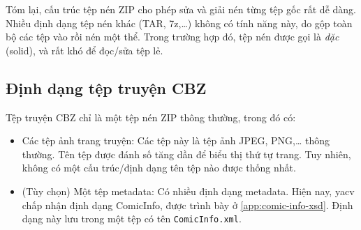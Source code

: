 \documentclass[../../thesis]{subfiles}
\begin{document}
Tóm lại, cấu trúc tệp nén ZIP cho phép sửa và giải nén từng tệp gốc rất dễ dàng.
Nhiều định dạng tệp nén khác (TAR, 7z,\ldots) không có tính năng này, do gộp
toàn bộ các tệp vào rồi nén một thể. Trong trường hợp đó, tệp nén được gọi là
\emph{đặc} (solid), và rất khó để đọc/sửa tệp lẻ.

\subsection{Định dạng tệp truyện CBZ}\label{sec:cbz}

Tệp truyện CBZ chỉ là một tệp nén ZIP thông thường, trong đó có:

\begin{itemize}
    \item
        Các tệp ảnh trang truyện: Các tệp này là tệp ảnh JPEG, PNG,\ldots{}
        thông thường. Tên tệp được đánh số tăng dần để biểu thị thứ tự trang.
        Tuy nhiên, không có một cấu trúc/định dạng tên tệp nào được thống nhất.
    \item
        (Tùy chọn) Một tệp metadata: Có nhiều định dạng metadata. Hiện nay, yacv
        chấp nhận định dạng ComicInfo, được trình bày ở
        \autoref{app:comic-info-xsd}. Định dạng này lưu trong một tệp có tên
        \texttt{ComicInfo.xml}.
\end{itemize}
\end{document}
